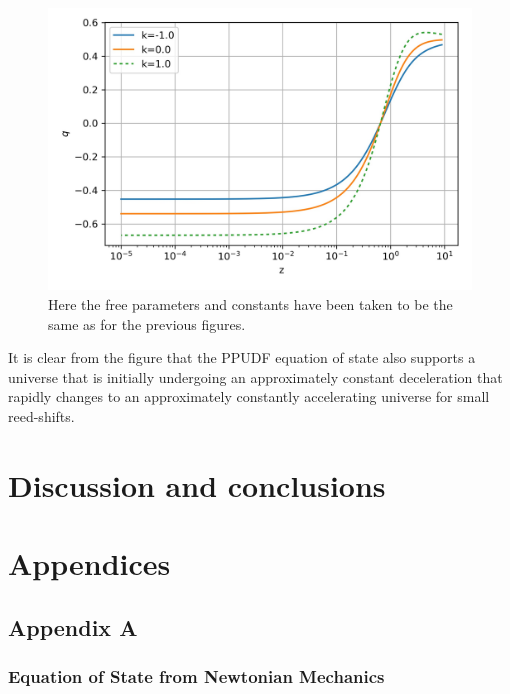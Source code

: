 \documentclass[a4paper, 11pt]{FSKH_623_Report}
\numberwithin{equation}{section}
\begin{document}
\begin{figure}[H]
\centering
\includegraphics[scale=1]{Figures/UDF_q.jpg}
\caption{Here the free parameters and constants have been taken to be the same as for the previous figures.}
\label{fig:UDFq}
\end{figure}
It is clear from the figure that the PPUDF equation of state also supports a universe that is initially undergoing an approximately constant deceleration that rapidly changes to an approximately constantly accelerating universe for small reed-shifts.

\chapter{Discussion and conclusions}


\newpage
\chapter{Appendices}
\section*{Appendix A}
\subsection*{Equation of State from Newtonian Mechanics}
\end{document}
